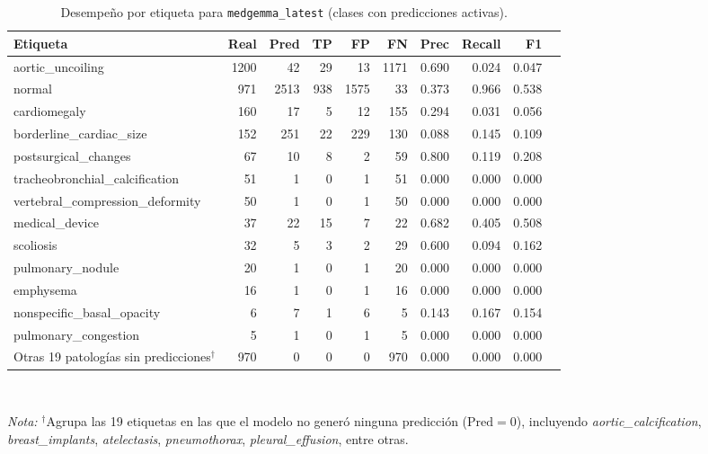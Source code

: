 \documentclass[../main.tex]{subfiles}
\begin{document}
\begin{table}[htbp]
\centering
\caption{Desempeño por etiqueta para \texttt{medgemma\_latest} (clases con predicciones activas).}
\label{tab:latest_per_tag}
\small
\setlength{\tabcolsep}{4pt}
\begin{tabular}{lrrrrrrrrr}
\toprule
\textbf{Etiqueta} & \textbf{Real} & \textbf{Pred} & \textbf{TP} & \textbf{FP} & \textbf{FN} & \textbf{Prec} & \textbf{Recall} & \textbf{F1} \\
\midrule
aortic\_uncoiling & 1200 & 42 & 29 & 13 & 1171 & 0.690 & 0.024 & 0.047 \\
normal & 971 & 2513 & 938 & 1575 & 33 & 0.373 & 0.966 & 0.538 \\
cardiomegaly & 160 & 17 & 5 & 12 & 155 & 0.294 & 0.031 & 0.056 \\
borderline\_cardiac\_size & 152 & 251 & 22 & 229 & 130 & 0.088 & 0.145 & 0.109 \\
postsurgical\_changes & 67 & 10 & 8 & 2 & 59 & 0.800 & 0.119 & 0.208 \\
tracheobronchial\_calcification & 51 & 1 & 0 & 1 & 51 & 0.000 & 0.000 & 0.000 \\
vertebral\_compression\_deformity & 50 & 1 & 0 & 1 & 50 & 0.000 & 0.000 & 0.000 \\
medical\_device & 37 & 22 & 15 & 7 & 22 & 0.682 & 0.405 & 0.508 \\
scoliosis & 32 & 5 & 3 & 2 & 29 & 0.600 & 0.094 & 0.162 \\
pulmonary\_nodule & 20 & 1 & 0 & 1 & 20 & 0.000 & 0.000 & 0.000 \\
emphysema & 16 & 1 & 0 & 1 & 16 & 0.000 & 0.000 & 0.000 \\
nonspecific\_basal\_opacity & 6 & 7 & 1 & 6 & 5 & 0.143 & 0.167 & 0.154 \\
pulmonary\_congestion & 5 & 1 & 0 & 1 & 5 & 0.000 & 0.000 & 0.000 \\
\midrule
Otras 19 patologías sin predicciones$^{\dagger}$ & 970 & 0 & 0 & 0 & 970 & 0.000 & 0.000 & 0.000 \\
\bottomrule
\end{tabular}
\\[1ex]
\raggedright \textit{Nota:} $^{\dagger}$Agrupa las 19 etiquetas en las que el modelo no generó ninguna predicción ($\text{Pred} = 0$), incluyendo \textit{aortic\_calcification}, \textit{breast\_implants}, \textit{atelectasis}, \textit{pneumothorax}, \textit{pleural\_effusion}, entre otras.
\end{table}
\end{document}
